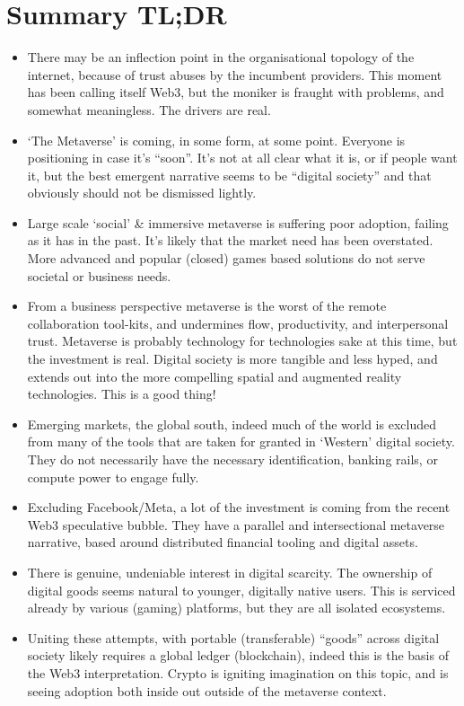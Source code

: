 \section{Summary TL;DR}
\label{sec:tldr}
\begin{itemize}
\item There may be an inflection point in the organisational topology of the internet, because of trust abuses by the incumbent providers. This moment has been calling itself Web3, but the moniker is fraught with problems, and somewhat meaningless. The drivers are real.
\item `The Metaverse' is coming, in some form, at some point. Everyone is positioning in case it's ``soon''. It's not at all clear what it is, or if people want it, but the best emergent narrative seems to be ``digital society'' and that obviously should not be dismissed lightly.
\item Large scale `social' \& immersive metaverse is suffering poor adoption, failing as it has in the past. It's likely that the market need has been overstated. More advanced and popular (closed) games based solutions do not serve societal or business needs.
\item From a business perspective metaverse is the worst of the remote collaboration tool-kits, and undermines flow, productivity, and interpersonal trust. Metaverse is probably technology for technologies sake at this time, but the investment is real. Digital society is more tangible and less hyped, and extends out into the more compelling spatial and augmented reality technologies. This is a good thing!
\item Emerging markets, the global south, indeed much of the world is excluded from many of the tools that are taken for granted in `Western' digital society. They do not necessarily have the necessary identification, banking rails, or compute power to engage fully.
\item Excluding Facebook/Meta, a lot of the investment is coming from the recent Web3 speculative bubble. They have a parallel and intersectional metaverse narrative, based around distributed financial tooling and digital assets. 
\item There is genuine, undeniable interest in digital scarcity. The ownership of digital goods seems natural to younger, digitally native users. This is serviced already by various (gaming) platforms, but they are all isolated ecosystems.
\item Uniting these attempts, with portable (transferable) ``goods'' across digital society likely requires a global ledger (blockchain), indeed this is the basis of the Web3 interpretation. Crypto is igniting imagination on this topic, and is seeing adoption both inside out outside of the metaverse context.

\end{itemize}
